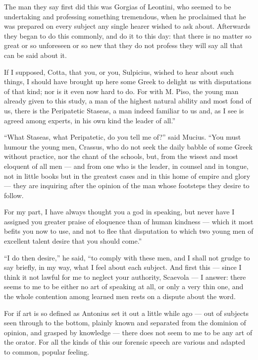  The man they say first did this was Gorgias of Leontini, who seemed to be undertaking and professing something tremendous, when he proclaimed that he was prepared on every subject any single hearer wished to ask about. Afterwards they began to do this commonly, and do it to this day: that there is no matter so great or so unforeseen or so new that they do not profess they will say all that can be said about it.

 If I supposed, Cotta, that you, or you, Sulpicius, wished to hear about such things, I should have brought up here some Greek to delight us with disputations of that kind; nor is it even now hard to do. For with M. Piso, the young man already given to this study, a man of the highest natural ability and most fond of us, there is the Peripatetic Staseas, a man indeed familiar to us and, as I see is agreed among experts, in his own kind the leader of all.''

 ``What Staseas, what Peripatetic, do you tell me of?'' said Mucius. ``You must humour the young men, Crassus, who do not seek the daily babble of some Greek without practice, nor the chant of the schools, but, from the wisest and most eloquent of all men — and from one who is the leader, in counsel and in tongue, not in little books but in the greatest cases and in this home of empire and glory — they are inquiring after the opinion of the man whose footsteps they desire to follow.

 For my part, I have always thought you a god in speaking, but never have I assigned you greater praise of eloquence than of human kindness — which it most befits you now to use, and not to flee that disputation to which two young men of excellent talent desire that you should come.''

 ``I do then desire,'' he said, ``to comply with these men, and I shall not grudge to say briefly, in my way, what I feel about each subject. And first this — since I think it not lawful for me to neglect your authority, Scaevola — I answer: there seems to me to be either no art of speaking at all, or only a very thin one, and the whole contention among learned men rests on a dispute about the word.

 For if art is so defined as Antonius set it out a little while ago — out of subjects seen through to the bottom, plainly known and separated from the dominion of opinion, and grasped by knowledge — there does not seem to me to be any art of the orator. For all the kinds of this our forensic speech are various and adapted to common, popular feeling.

